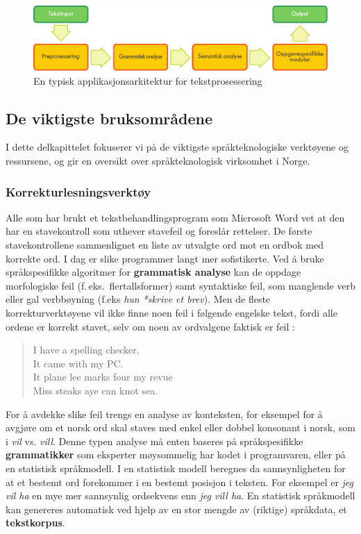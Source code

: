 \begin{multicols}{2}
\begin{figure}[htb]
  \center
  \includegraphics[width=\textwidth]{../_media/norwegian-bokmaal/text_processing_app_architecture}
  \caption{En typisk applikasjonsarkitektur for tekstprosessering}
  \label{fig:textprocessingarch_no}
\end{figure}

\subsection{De viktigste bruksområdene}

I dette delkapittelet fokuserer vi på de viktigste språkteknologiske verktøyene og ressursene, og gir en oversikt over språkteknologisk virksomhet i Norge. 

\subsubsection{Korrekturlesningsverktøy}

Alle som har brukt et tekstbehandlingsprogram som Microsoft Word vet at den har en stavekontroll som uthever stavefeil og foreslår rettelser. De første stavekontrollene  sammenlignet en liste av utvalgte ord mot en ordbok med korrekte ord. I dag er slike programmer langt mer sofistikerte. Ved å bruke språkspesifikke algoritmer for \textbf{grammatisk analyse} kan de oppdage morfologiske feil (f.\,eks.~flertallsformer) samt syntaktiske feil, som manglende verb eller gal verbbøyning (f.eks \textit{hun *skrive et brev}). Men de fleste korrekturverktøyene vil ikke finne noen feil i følgende engelske tekst, fordi alle ordene er korrekt stavet, selv om noen av ordvalgene faktisk er feil \cite{zar1}:
 
\begin{quote}
  I have a spelling checker,\\
  It came with my PC.\\
  It plane lee marks four my revue\\
  Miss steaks aye can knot sea.
\end{quote}

For å avdekke slike feil trengs en analyse av konteksten, for eksempel for å avgjøre om et norsk ord skal staves med enkel eller dobbel konsonant i norsk, som i \textit{vil} vs. \textit{vill}.
Denne typen analyse må enten baseres på språkspesifikke \textbf{grammatikker} som eksperter møysommelig har kodet i programvaren, eller på en statistisk språkmodell. 
I en statistisk modell beregnes da sannsynligheten for at et bestemt ord forekommer i en bestemt posisjon i teksten. For eksempel er \textit{jeg vil ha} en mye mer sannsynlig ordsekvens enn \textit{jeg vill ha}. En statistisk språkmodell kan genereres automatisk ved hjelp av en stor mengde av (riktige) språkdata, et \textbf{tekstkorpus}. 


\end{multicols}
